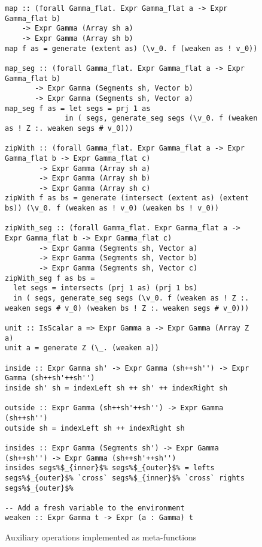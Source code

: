 \begin{figure}
\begin{lstlisting}[style=ndp]
map :: (forall Gamma_flat. Expr Gamma_flat a -> Expr Gamma_flat b)
    -> Expr Gamma (Array sh a)
    -> Expr Gamma (Array sh b)
map f as = generate (extent as) (\v_0. f (weaken as ! v_0))

map_seg :: (forall Gamma_flat. Expr Gamma_flat a -> Expr Gamma_flat b)
       -> Expr Gamma (Segments sh, Vector b)
       -> Expr Gamma (Segments sh, Vector a)
map_seg f as = let segs = prj 1 as
              in ( segs, generate_seg segs (\v_0. f (weaken as ! Z :. weaken segs # v_0)))

zipWith :: (forall Gamma_flat. Expr Gamma_flat a -> Expr Gamma_flat b -> Expr Gamma_flat c)
        -> Expr Gamma (Array sh a)
        -> Expr Gamma (Array sh b)
        -> Expr Gamma (Array sh c)
zipWith f as bs = generate (intersect (extent as) (extent bs)) (\v_0. f (weaken as ! v_0) (weaken bs ! v_0))

zipWith_seg :: (forall Gamma_flat. Expr Gamma_flat a -> Expr Gamma_flat b -> Expr Gamma_flat c)
        -> Expr Gamma (Segments sh, Vector a)
        -> Expr Gamma (Segments sh, Vector b)
        -> Expr Gamma (Segments sh, Vector c)
zipWith_seg f as bs =
  let segs = intersects (prj 1 as) (prj 1 bs)
  in ( segs, generate_seg segs (\v_0. f (weaken as ! Z :. weaken segs # v_0) (weaken bs ! Z :. weaken segs # v_0)))

unit :: IsScalar a => Expr Gamma a -> Expr Gamma (Array Z a)
unit a = generate Z (\_. (weaken a))

inside :: Expr Gamma sh' -> Expr Gamma (sh++sh'') -> Expr Gamma (sh++sh'++sh'')
inside sh' sh = indexLeft sh ++ sh' ++ indexRight sh

outside :: Expr Gamma (sh++sh'++sh'') -> Expr Gamma (sh++sh'')
outside sh = indexLeft sh ++ indexRight sh

insides :: Expr Gamma (Segments sh') -> Expr Gamma (sh++sh'') -> Expr Gamma (sh++sh'++sh'')
insides segs%$_{inner}$% segs%$_{outer}$% = lefts segs%$_{outer}$% `cross` segs%$_{inner}$% `cross` rights segs%$_{outer}$%

-- Add a fresh variable to the environment
weaken :: Expr Gamma t -> Expr (a : Gamma) t
\end{lstlisting}
\caption{Auxiliary operations implemented as meta-functions}
\label{fig:lst-auxiliary}
\end{figure}
%

